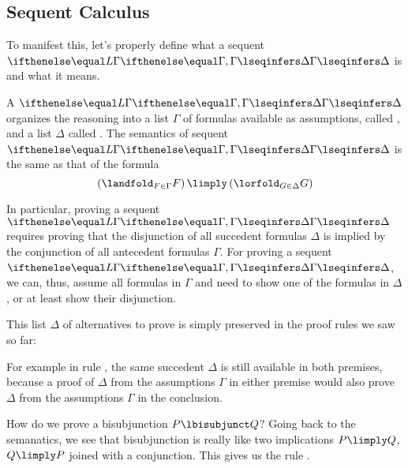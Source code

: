 \documentclass[11pt,twoside]{scrartcl}
\newcommand{\asfml}{F}
\newcommand{\bsfml}{G}
\def\rightrule{R}%
\begin{document}
\subsection{Sequent Calculus}
To manifest this, let's properly define what a sequent \(\lsequent{\Gamma}{\Delta}\) is and what it means.

\begin{definition}[Sequent] \label{def:sequent}
A  \(\lsequent{\Gamma}{\Delta}\) organizes the reasoning into a list $\Gamma$ of formulas available as assumptions, called , and a list $\Delta$ called .
The semantics of sequent \(\lsequent{\Gamma}{\Delta}\) is the same as that of the formula
\[
\left(\landfold_{F\in\Gamma} F\right) \limply \left(\lorfold_{G\in\Delta} G\right)
\]
\end{definition}
In particular, proving a sequent \(\lsequent{\Gamma}{\Delta}\) requires proving that the disjunction of all succedent formulas $\Delta$ is implied by the conjunction of all antecedent formulas $\Gamma$.
For proving a sequent \(\lsequent{\Gamma}{\Delta}\), we can, thus, assume all formulas in $\Gamma$ and need to show one of the formulas in $\Delta$, or at least show their disjunction.

This list $\Delta$ of alternatives to prove is simply preserved in the proof rules we saw so far:

\begin{calculus}
\end{calculus}

For example in rule , the same succedent $\Delta$ is still available in both premises, because a proof of $\Delta$ from the assumptions $\Gamma$ in either premise would also prove $\Delta$ from the assumptions $\Gamma$ in the conclusion.

How do we prove a bisubjunction $P \lbisubjunct Q$? Going back to the semanatics, we see that bisubjunction is really like two implications $P \limply Q$, $Q \limply P$ joined with a conjunction. This gives us the rule .

\begin{calculus}
\cinferenceRule[equivr|$\lbisubjunct$\rightrule]{$\lbisubjunct$ right}
{\linferenceRule[sequent]
  {
    \lsequent[L]{}{\asfml \limply \bsfml}
    &\lsequent[L]{}{\bsfml \limply \asfml}
  }
  {\lsequent[L]{}{\asfml \lbisubjunct \bsfml}}
}{}%
\end{calculus}
\end{document}
